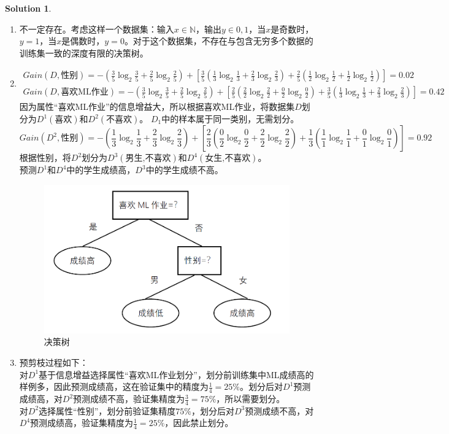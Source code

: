 \documentclass[a4paper,UTF8]{article}
\theoremstyle{definition}
\newtheorem*{solution}{Solution}
\begin{document}
\begin{solution}
	~\\
	\begin{enumerate}[(1)]
		\item 
		不一定存在。考虑这样一个数据集：输入$x\in \mathbb{N}$，输出$y\in {0,1}$，当$x$是奇数时，$y=1$，当$x$是偶数时，$y=0$。对于这个数据集，不存在与包含无穷多个数据的训练集一致的深度有限的决策树。
		\item 
		\begin{multline*}
		Gain(D,\text{性别})=-(\frac35\log_2\frac35+\frac25\log_2\frac25)+[\frac35(\frac13\log_2\frac13+\frac23\log_2\frac23)+\frac25(\frac12\log_2\frac12+\frac12\log_2\frac12)]=0.02\\
		Gain(D,\text{喜欢ML作业})=-(\frac35\log_2\frac35+\frac25\log_2\frac25)+[\frac25(\frac22\log_2\frac22+\frac02\log_2\frac02)+\frac35(\frac13\log_2\frac13+\frac23\log_2\frac23)]=0.42
		\end{multline*}
		因为属性“喜欢ML作业”的信息增益大，所以根据喜欢ML作业，将数据集$D$划分为$D^1(\text{喜欢})$和$D^2(\text{不喜欢})$。
		$D_1$中的样本属于同一类别，无需划分。
		\[
		Gain(D^2,\text{性别})=-(\frac13\log_2\frac13+\frac23\log_2\frac23)+[\frac23(\frac02\log_2\frac02+\frac22\log_2\frac22)+\frac13(\frac11\log_2\frac11+\frac01\log_2\frac01)]=0.92
		\]
		根据性别，将$D^2$划分为$D^3(\text{男生,不喜欢})$和$D^4(\text{女生,不喜欢})$。\\
		预测$D^1$和$D^4$中的学生成绩高，$D^3$中的学生成绩不高。
		\begin{figure}[htbp]
			\centering
			\includegraphics[width=.4\textwidth]{figure2.png}
			\caption{决策树}
		\end{figure}
		\item 
		预剪枝过程如下：\\
		对$D^1$基于信息增益选择属性“喜欢ML作业划分”，划分前训练集中ML成绩高的样例多，因此预测成绩高，这在验证集中的精度为$\frac14=25\%$。划分后对$D^1$预测成绩高，对$D^2$预测成绩不高，验证集精度为$\frac34=75\%$，所以需要划分。\\
		对$D^2$选择属性“性别”，划分前验证集精度$75\%$，划分后对$D^3$预测成绩不高，对$D^4$预测成绩高，验证集精度为$\frac14=25\%$，因此禁止划分。\\

\end{enumerate}
\end{solution}
\end{document}
